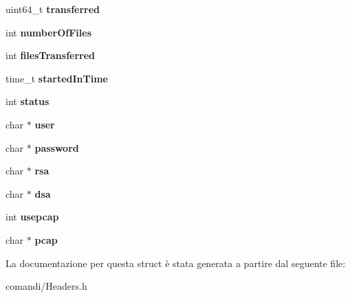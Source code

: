 \begin{DoxyCompactItemize}
\item 
uint64\+\_\+t {\bfseries transferred}\hypertarget{struct____attribute_____a86e526b44ece81dc09cd47c43943ab30}{}\label{struct____attribute_____a86e526b44ece81dc09cd47c43943ab30}

\item 
int {\bfseries number\+Of\+Files}\hypertarget{struct____attribute_____a3dcb5ef9a02a1d060dfe94357cedeca3}{}\label{struct____attribute_____a3dcb5ef9a02a1d060dfe94357cedeca3}

\item 
int {\bfseries files\+Transferred}\hypertarget{struct____attribute_____a1b6abbcd74a6b89dabf679b2460b90ac}{}\label{struct____attribute_____a1b6abbcd74a6b89dabf679b2460b90ac}

\item 
time\+\_\+t {\bfseries started\+In\+Time}\hypertarget{struct____attribute_____ac3b6c3e36f5c609acf7c77a1eb921c9d}{}\label{struct____attribute_____ac3b6c3e36f5c609acf7c77a1eb921c9d}

\item 
int {\bfseries status}\hypertarget{struct____attribute_____a125027509765b665b98fed8d9de0848d}{}\label{struct____attribute_____a125027509765b665b98fed8d9de0848d}

\item 
char $\ast$ {\bfseries user}\hypertarget{struct____attribute_____ad23483495fb03dd260d457134fd94c4f}{}\label{struct____attribute_____ad23483495fb03dd260d457134fd94c4f}

\item 
char $\ast$ {\bfseries password}\hypertarget{struct____attribute_____a2fa90ae328c2853fc26b7cd11861e277}{}\label{struct____attribute_____a2fa90ae328c2853fc26b7cd11861e277}

\item 
char $\ast$ {\bfseries rsa}\hypertarget{struct____attribute_____a912e18cf5d49045f2567cdd73a1f53fa}{}\label{struct____attribute_____a912e18cf5d49045f2567cdd73a1f53fa}

\item 
char $\ast$ {\bfseries dsa}\hypertarget{struct____attribute_____a9fb5a4df67ee7f6cc1bb3f2d1ecf68a3}{}\label{struct____attribute_____a9fb5a4df67ee7f6cc1bb3f2d1ecf68a3}

\item 
int {\bfseries usepcap}\hypertarget{struct____attribute_____a6fccd4e2bb45a0ed006c9a737d8d687d}{}\label{struct____attribute_____a6fccd4e2bb45a0ed006c9a737d8d687d}

\item 
char $\ast$ {\bfseries pcap}\hypertarget{struct____attribute_____a52116e1dd833c1b317ba3716d3c8ea90}{}\label{struct____attribute_____a52116e1dd833c1b317ba3716d3c8ea90}

\end{DoxyCompactItemize}


La documentazione per questa struct è stata generata a partire dal seguente file\+:\begin{DoxyCompactItemize}
\item 
comandi/Headers.\+h\end{DoxyCompactItemize}
